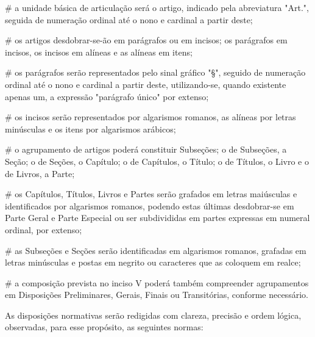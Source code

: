 \documentclass[a5paper,capitulo,titlepage=false]{br-lex}
\begin{document}
\begin{easylist}
# a unidade básica de articulação será o artigo, indicado pela abreviatura "Art.", seguida de numeração ordinal até o nono e cardinal a partir deste;

# os artigos desdobrar-se-ão em parágrafos ou em incisos; os parágrafos em incisos, os incisos em alíneas e as alíneas em itens;

# os parágrafos serão representados pelo sinal gráfico "§", seguido de numeração ordinal até o nono e cardinal a partir deste, utilizando-se, quando existente apenas um, a expressão "parágrafo único" por extenso;

# os incisos serão representados por algarismos romanos, as alíneas por letras minúsculas e os itens por algarismos arábicos;

# o agrupamento de artigos poderá constituir Subseções; o de Subseções, a Seção; o de Seções, o Capítulo; o de Capítulos, o Título; o de Títulos, o Livro e o de Livros, a Parte;

# os Capítulos, Títulos, Livros e Partes serão grafados em letras maiúsculas e identificados por algarismos romanos, podendo estas últimas desdobrar-se em Parte Geral e Parte Especial ou ser subdivididas em partes expressas em numeral ordinal, por extenso;

# as Subseções e Seções serão identificadas em algarismos romanos, grafadas em letras minúsculas e postas em negrito ou caracteres que as coloquem em realce;

# a composição prevista no inciso V poderá também compreender agrupamentos em Disposições Preliminares, Gerais, Finais ou Transitórias, conforme necessário.	
\end{easylist}

\artigo As disposições normativas serão redigidas com clareza, precisão e ordem lógica, observadas, para esse propósito, as seguintes normas: 
\end{document}
